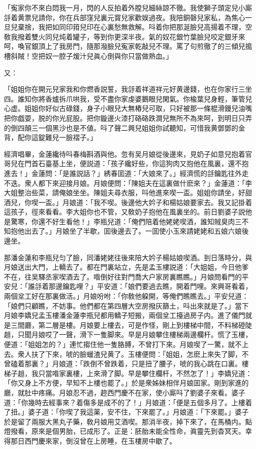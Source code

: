 \begin{myquote}
「寃家你不來白悶我一月，閃的人反拍着外膛兒細絲諒不徹。我使獅子頭定兒小廝㧱着黄票兒請你，你在兵部窪兒裏元寳兒家歡娱過夜。我陪銅磬兒家私，為焦心一旦兒棄捨，我把如同印箝兒印在心裏愁無救解。呌着你把那涎臉兒高揚着不理，空敎我撥着雙火同兒炖着罐子，等到你更深半夜。氣的奴花銀竹葉臉兒咬定銀牙來呵，喚官銀頂上了我房門，隨那潑臉兒寃家乾敲兒不理。罵了句煎徹了的三傾兒搗槽斜賊！空把奴一腔子煖汁兒眞心倒與你只當做熱血。」
\end{myquote}

又：

\begin{myquote}
「姐姐你在開元兒家我和你燃香説誓，我㧱着祥道祥元好黄邊錢，也在你家行三坐四。誰知你將香爐拆爪哄我，受不盡你家虔婆鵝眼兒閑氣。你楡葉兒身輕，筆管兒心虚。姐姐你好似古碌錢，身子小眼兒大無樁兒可取，只好被那一條棍滑鏝兒油嘴把你戯耍，脱的你光屁股。把你鏇邊火漆打硌硌跌澗兒無所不為來呵，到明日只弄的倒四顛三一個黑沙也是不値。呌了聲二興兒姐姐你試聽知，可惜我黄鄧鄧的金背，配你這錠難兒一臉褶子。」
\end{myquote}

經濟唱畢，金蓮纔待呌春梅斟酒與他。忽有吴月娘從後邊來，見奶子如意兒抱着官哥兒在門首石臺基上坐，便説道：「孩子纔好些，你這狗肉又抱他在風裏，還不抱進去！」金蓮問：「是誰説話？」綉春囬道：「大娘來了。」經濟慌的㧱鑰匙往外走不迭。衆人都下來迎接月娘。月娘便問：「陳姐夫在這裏做什麽來？」金蓮道：「李大姐整治些菜，請俺娘坐坐。陳姐夫尋衣服，呌他進來喫一盃。姐姐你請坐，好甜酒兒，你喫一盃。」月娘道：「我不喫。後邊他大妗子和楊姑娘要家去。我又記掛着這孩子，徑來看看。李大姐你也不管，又敎奶子抱他在風裏坐的。前日劉婆子説他是驚寒，你還不好生看他！」李瓶兒道：「俺們陪着他姥姥喫酒，誰知賊臭肉三不知抱他出去了。」月娘坐了半歇，囬後邊去了。一囬使小玉來請姥姥和五娘六娘後邊坐。

那潘金蓮和李瓶兒匀了臉，同潘姥姥往後來陪大妗子楊姑娘喫酒。到日落時分，與月娘送出大門，上轎去了。都在門裏站立，先是孟玉樓説道：「大姐姐，今日他爹不在，往吴驛丞家喫酒去了。喒倒好往對門喬大户家房裏瞧瞧。」月娘問看門的平安兒：「誰㧱着那邊鑰匙哩？」平安道：「娘們要過去瞧，開着門哩。來興哥看着，兩個坌工好在那裏做活。」月娘吩咐：「你敎他躱開，等俺們瞧瞧去。」平安兒道：「娘們只顧瞧，不妨事。他們都在第四層大空房撥灰篩土，呌出來就是了。」當下月娘李嬌兒孟玉樓潘金蓮李瓶兒都用轎子短搬，兩個坌工擡過房子内。進了儀門就是三間廳，第二層是樓。月娘要上樓去，可是作怪，剛上到樓梯中間，不料梯磴陡趄，只聞月娘哎了一聲，滑下一隻脚來。早是月娘攀住樓梯兩邊欄杆。慌了玉樓，便道：「姐姐怎的？」連忙搊住他一隻胳膊，不曾打下來。月娘喫了一驚，就不上去。衆人扶了下來，唬的臉蠟渣兒黄了。玉樓便問：「姐姐，怎麽上來失了脚，不曾磕着那裏？」月娘道：「跌倒不曾跌着，只是扭了腰子，唬的我心跳在口裏。樓梯子趄，我只當喒家裏樓，上來滑了脚。早是攀住欄杆，不然怎了！」李嬌兒道：「你又身上不方便，早知不上樓也罷了。」於是衆姊妹相伴月娘囬家。剛到家進的廳，就肚中疼痛。月娘忍不過，趂西門慶不在家，使小廝呌了劉婆子來看。婆子道：「你幾時去經事來？着傷多是成不的了！」月娘道：「便是五個多月了。上樓着了扭。」婆子道：「你喫了我這薬，安不住，下來罷了。」月娘道：「下來罷。」婆子於是留了兩服大黑丸子藥，敎月娘用艾酒喫。那消半夜，掉下來了，在馬桶内。點燈撥看，原來是個男胎，已成形了。正是：胚胎未能全性命，眞靈先到杳冥天。幸得那日西門慶來家，倒沒曾在上房睡，在玉樓房中歇了。

